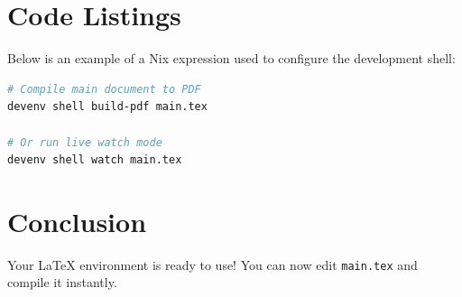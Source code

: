 \documentclass[11pt,a4paper]{article}
\begin{document}
\section{Code Listings}
Below is an example of a Nix expression used to configure the development shell:

\begin{lstlisting}[language=bash, caption={Build command with latexmk}]
# Compile main document to PDF
devenv shell build-pdf main.tex

# Or run live watch mode
devenv shell watch main.tex
\end{lstlisting}

\section{Conclusion}
Your LaTeX environment is ready to use! You can now edit \texttt{main.tex} and compile it instantly.



\end{document}
